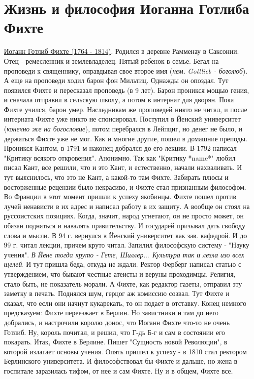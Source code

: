 \section{Жизнь и философия Иоганна Готлиба Фихте}
\underline{Иоганн Готлиб Фихте (1764 - 1814)}. Родился в деревне Рамменау в Саксонии. Отец - ремесленник и землевладелец. Пятый ребенок в семье. Бегал на проповеди к священнику, оправдывая свое второе имя (\textit{нем. Gottlieb - боголюб}). А еще на проповеди ходил барон фон Мильтиц. Однажды он опоздал. Тут появился Фихте и пересказал проповедь (в 9 лет). Барон проникся мощью гения, и сначала отправил в сельскую школу, а потом в интернат для дворян. Пока Фихте учился, барон умер. Наследникам же проповедей никто не читал, и после интерната Фихте уже никто не спонсировал. Поступил в Йенский университет (\textit{конечно же на богословие}), потом перебрался в Лейпциг, но денег не было, и держаться Фихте уже не мог. Как и многие другие, пошел в домашние преподы. Проникся Кантом, в 1791-м наконец добрался до его лекции. В 1792 написал "Критику всякого откровения". Анонимно. Так как "Критику *name*" любил писал Кант, все решили, что и это Кант, и естественно, начали нахваливать. И тут выяснилось, что это не Кант, а какой-то там Фихте. Забирать плюсы и восторженные рецензии было некрасиво, и Фихте стал признанным философом. Во Франции в этот момент пришли к успеху якобинцы. Фихте пошел против лучей ненависти в их адрес и написал работу в их защиту. А вообще он стоял на руссоистских позициях. Когда, значит, народ угнетают, он не просто может, он обязан подняться и навалять правительству. И государей призывал дать свободу слова и мысли. В 94 г. вернулся в Йенский университет как зав. кафедрой. И  до 99 г. читал лекции, причем круто читал. Запилил философскую систему - "Науку учения". \textit{В Йене тогда круто - Гете, Шиллер... Культура так и лезла изо всех щелей}.
И тут пришла беда, откуда не ждали. Ректор Ферберг написал статью с утверждением, что бывают честные атеисты и веруны-проходимцы. Религия, стало быть, не показатель морали. А Фихте, как редактор газеты, отправил эту заметку в печать. Поднялся шум, герцог аж комиссию созвал. Тут Фихте и сказал, что если они начнут кукарекать, то он подает в отставку. Конец немного предсказуем: Фихте переезжает в Берлин. Но завистники и там до него добрались, и настрочили королю донос, что Иоганн Фихте что-то не очень Готлиб. Ну, король почитал, и решил, что Г-дь Б-г и сам в состоянии его покарать. Итак, Фихте в Берлине. Пишет "Сущность новой Революции", в которой излагает основы учения. Опять пришел к успеху - в 1810 стал ректором Берлинского университета. И философствовал бы Фихте и дальше, но жена в госпитале заразилась тифом, от нее и сам Фихте. Ну и в общем, Фихте все.

